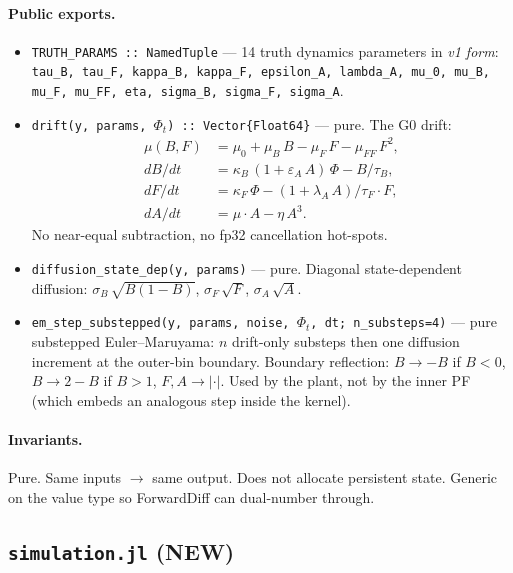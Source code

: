 \documentclass[11pt,a4paper]{article}
\begin{document}
\paragraph{Public exports.}

\begin{itemize}[itemsep=2pt,leftmargin=*]
\item \texttt{TRUTH\_PARAMS :: NamedTuple} --- 14 truth dynamics
  parameters in \emph{v1 form}: \texttt{tau\_B, tau\_F, kappa\_B,
  kappa\_F, epsilon\_A, lambda\_A, mu\_0, mu\_B, mu\_F, mu\_FF, eta,
  sigma\_B, sigma\_F, sigma\_A}.

\item \texttt{drift(y, params, $\Phi_t$) :: Vector\{Float64\}} ---
  pure. The G0 drift:
  \begin{align*}
  \mu(B, F) &= \mu_0 + \mu_B\,B - \mu_F\,F - \mu_{FF}\,F^2, \\
  dB/dt &= \kappa_B\,(1 + \varepsilon_A\,A)\,\Phi - B/\tau_B, \\
  dF/dt &= \kappa_F\,\Phi - (1 + \lambda_A\,A) / \tau_F \cdot F, \\
  dA/dt &= \mu \cdot A - \eta\,A^3.
  \end{align*}
  No near-equal subtraction, no fp32 cancellation hot-spots.

\item \texttt{diffusion\_state\_dep(y, params)} --- pure. Diagonal
  state-dependent diffusion: $\sigma_B\,\sqrt{B(1-B)}$,
  $\sigma_F\,\sqrt{F}$, $\sigma_A\,\sqrt{A}$.

\item \texttt{em\_step\_substepped(y, params, noise, $\Phi_t$, dt;
  n\_substeps=4)} --- pure substepped Euler--Maruyama: $n$
  drift-only substeps then one diffusion increment at the outer-bin
  boundary. Boundary reflection: $B \to -B$ if $B<0$, $B \to 2-B$
  if $B>1$, $F, A \to |\cdot|$. Used by the plant, not by the inner
  PF (which embeds an analogous step inside the kernel).
\end{itemize}

\paragraph{Invariants.} Pure. Same inputs $\to$ same output. Does
not allocate persistent state. Generic on the value type so
ForwardDiff can dual-number through.

\subsection{\texttt{simulation.jl} (NEW)}
\end{document}
